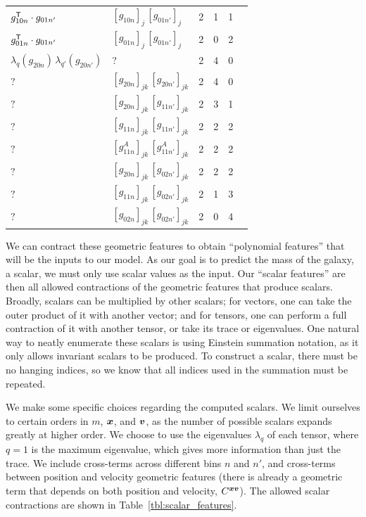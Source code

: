 \begin{table}
\begin{tabular}{|l|l|l|l|l|l|}
    $g_{10n}^{\mathsf{T}} \cdot g_{01n'}$ & $[g_{10n}]_j \, [g_{01n'}]_j$ & 2 & 1 & 1 \\
    $g_{01n}^{\mathsf{T}} \cdot g_{01n'}$ & $[g_{01n}]_j \, [g_{01n'}]_j$ & 2 & 0 & 2 \\
    $\lambda_q(g_{20n}) \, \lambda_{q'}(g_{20n'})$ & ? & 2 & 4 & 0 \\
    $ ? $ & $[g_{20n}]_{jk} \, [g_{20n'}]_{jk}$ & 2 & 4 & 0 \\
    $ ? $ & $[g_{20n}]_{jk} \, [g_{11n'}]_{jk}$ & 2 & 3 & 1 \\
    $ ? $ & $[g_{11n}]_{jk} \, [g_{11n'}]_{jk}$ & 2 & 2 & 2 \\
    $ ? $ & $[g^A_{11n}]_{jk} \, [g^A_{11n'}]_{jk}$ & 2 & 2 & 2 \\
    $ ? $ & $[g_{20n}]_{jk} \, [g_{02n'}]_{jk}$ & 2 & 2 & 2 \\
    $ ? $ & $[g_{11n}]_{jk} \, [g_{02n'}]_{jk}$ & 2 & 1 & 3 \\
    $ ? $ & $[g_{02n}]_{jk} \, [g_{02n'}]_{jk}$ & 2 & 0 & 4 \\
    \hline
    \end{tabular}
\end{table}

We can contract these geometric features to obtain ``polynomial features'' that will be the inputs to our model.
As our goal is to predict the mass of the galaxy, a scalar, we must only use scalar values as the input.
Our ``scalar features'' are then all allowed contractions of the geometric features that produce scalars. 
Broadly, scalars can be multiplied by other scalars; for vectors, one can take the outer product of it with another vector; and for tensors, one can perform a full contraction of it with another tensor, or take its trace or eigenvalues.
One natural way to neatly enumerate these scalars is using Einstein summation notation, as it only allows invariant scalars to be produced.
To construct a scalar, there must be no hanging indices, so we know that all indices used in the summation must be repeated.

We make some specific choices regarding the computed scalars.
We limit ourselves to certain orders in $m$, $\bm{x}$, and $\bm{v}$, as the number of possible scalars expands greatly at higher order.
We choose to use the eigenvalues $\lambda_q$ of each tensor, where $q=1$ is the maximum eigenvalue, which gives more information than just the trace.
We include cross-terms across different bins $n$ and $n'$, and cross-terms between position and velocity geometric features (there is already a geometric term that depends on both position and velocity, $C^{\bm{x} \bm{v}}$).
The allowed scalar contractions are shown in Table~\ref{tbl:scalar_features}.

